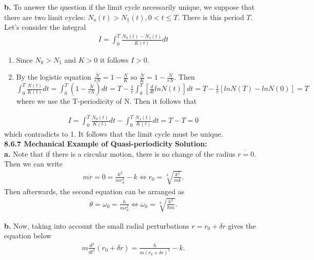 \documentclass[12pt]{article}
\newcommand{\mycbox}[1]{\tikz{\path[draw=#1,fill=#1] (0,0) rectangle (.2cm,.2cm);}}
\begin{document}
	{\bf b. } To answer the question if the limit cycle necessarily unique, we suppose that there are two limit cycles: $N_o(t)>N_1(t), 0<t \leq T.$ There is this period $T.$ Let's consider the integral 
	\begin{align*}
	I=\int_0^T\frac{N_0(t)-N_1(t)}{K(t)} dt 
	\end{align*}
	\begin{enumerate}
		\item Since $N_0> N_1$ and $K>0$ it follows $I>0.$\\
		\item By the logistic equation $\frac{\dot{N}}{rN}=1-\frac{N}{K}$ so $\frac{N}{K}=1-\frac{\dot{N}}{rN}.$ Then $\int_0^T \frac{N(t)}{K(t)} dt=\int_0^T \left(1-\frac{\dot{N}}{rN}\right) dt=T-\frac{1}{r} \int_0^T \left[\frac{d}{dt} ln N(t)\right] dt=T-\frac{1}{r}\left[ln N(T)-ln N(0)\right]=T$ where we use the T-periodicity of N. Then it follows that 
	\end{enumerate}
	\begin{align*}
	I=\int_0^T \frac{N_0(t)}{K(t)} dt-\int_0^T \frac{N_1(t)}{K(t)} dt=T-T=0
	\end{align*} 
	which contradicts to 1. It follows that the limit cycle must be unique. \mycbox{black}\\
	
	\noindent
	{\bf 8.6.7 Mechanical Example of Quasi-periodicity}
	{\bf Solution:}\\
	
	{\bf a. } Note that if there is a circular motion, there is no change of the radius $\ddot{r=0.}$ Then we can write 
	\begin{align*}
	m\ddot{r}=0=\frac{h^2}{mr_0^3}-k \Longleftrightarrow r_0=\sqrt[3]{\frac{k^2}{mk}}.
	\end{align*}
	Then afterwards, the second equation can be arranged as 
	\begin{align*}
	\dot{\theta}=\omega_0=\frac{h}{mr_0^2}\Longleftrightarrow \omega_0=\sqrt[3]{\frac{k^2}{hm}}.
	\end{align*}
	
	\indent
	{\bf b. } Now, taking into account the small radial perturbations $r=r_0+\delta r$ gives the equation below
	\begin{align*}
	m\frac{d^2}{dt^2}\left(r_0+\delta r\right)=\frac{h}{m \left(r_0+\delta r\right)^3}-k.
	\end{align*}
	
\end{document}
